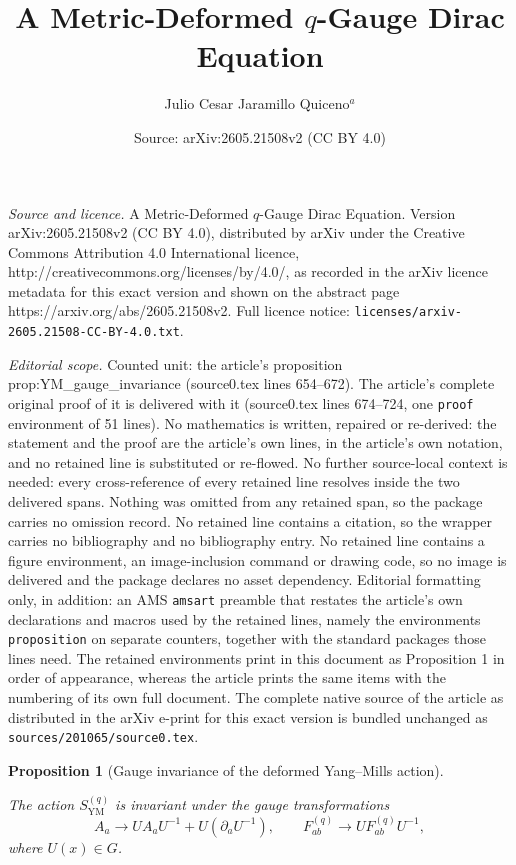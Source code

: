 \documentclass[10pt,a4paper]{amsart}
\title{A Metric-Deformed $q$-Gauge Dirac Equation}
\author{Julio Cesar Jaramillo Quiceno$^a$}
\date{Source: arXiv:2605.21508v2 (CC BY 4.0)}
\newtheorem{proposition}{Proposition}
\begin{document}
\maketitle

\noindent\emph{Source and licence.} A Metric-Deformed $q$-Gauge Dirac Equation. Version arXiv:2605.21508v2 (CC BY 4.0), distributed by arXiv under the Creative Commons Attribution 4.0 International licence, http://creativecommons.org/licenses/by/4.0/, as recorded in the arXiv licence metadata for this exact version and shown on the abstract page https://arxiv.org/abs/2605.21508v2. Full licence notice: \texttt{licenses/arxiv-2605.21508-CC-BY-4.0.txt}.\par\smallskip

\noindent\textit{Editorial scope.} Counted unit: the article's proposition prop:YM\_gauge\_invariance (source0.tex lines 654--672). The article's complete original proof of it is delivered with it (source0.tex lines 674--724, one \texttt{proof} environment of 51 lines). No mathematics is written, repaired or re-derived: the statement and the proof are the article's own lines, in the article's own notation, and no retained line is substituted or re-flowed.  No further source-local context is needed: every cross-reference of every retained line resolves inside the two delivered spans.  Nothing was omitted from any retained span, so the package carries no omission record.  No retained line contains a citation, so the wrapper carries no bibliography and no bibliography entry.  No retained line contains a figure environment, an image-inclusion command or drawing code, so no image is delivered and the package declares no asset dependency.  Editorial formatting only, in addition: an AMS \texttt{amsart} preamble that restates the article's own declarations and macros used by the retained lines, namely the environments \texttt{proposition} on separate counters, together with the standard packages those lines need.  The retained environments print in this document as Proposition 1 in order of appearance, whereas the article prints the same items with the numbering of its own full document.  The complete native source of the article as distributed in the arXiv e-print for this exact version is bundled unchanged as \texttt{sources/201065/source0.tex}.
\begin{proposition}[Gauge invariance of the deformed Yang--Mills action]
\label{prop:YM_gauge_invariance}

The action \(S_{\mathrm{YM}}^{(q)}\) is invariant under the gauge transformations
\begin{equation}
A_a
\longrightarrow
U A_a U^{-1}
+
U(\partial_a U^{-1}),
\qquad
F_{ab}^{(q)}
\longrightarrow
U F_{ab}^{(q)} U^{-1},
\label{eq:gauge_transform_YM}
\end{equation}
where \(U(x)\in G\).

\end{proposition}
\end{document}
